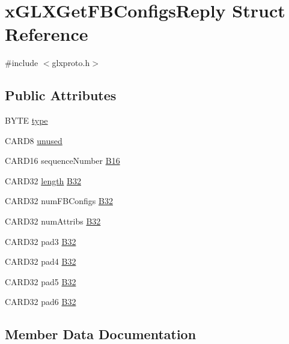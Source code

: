 \hypertarget{structx_g_l_x_get_f_b_configs_reply}{}\section{x\+G\+L\+X\+Get\+F\+B\+Configs\+Reply Struct Reference}
\label{structx_g_l_x_get_f_b_configs_reply}


{\ttfamily \#include $<$glxproto.\+h$>$}

\subsection*{Public Attributes}
\begin{DoxyCompactItemize}
\item 
B\+Y\+TE \hyperlink{structx_g_l_x_get_f_b_configs_reply_acb898b3d0a71dcc0e326ce35af8d2f04}{type}
\item 
C\+A\+R\+D8 \hyperlink{structx_g_l_x_get_f_b_configs_reply_ab613d10c2cf2423cbe3f851aae8828e7}{unused}
\item 
C\+A\+R\+D16 sequence\+Number \hyperlink{structx_g_l_x_get_f_b_configs_reply_abbff4e7ffe425b09e5b18979db3617a0}{B16}
\item 
C\+A\+R\+D32 \hyperlink{glcorearb_8h_ab9c919755bde3b34349e23a32b4e0fa7}{length} \hyperlink{structx_g_l_x_get_f_b_configs_reply_adfe70608434253084f11a15fa0c4e8b9}{B32}
\item 
C\+A\+R\+D32 num\+F\+B\+Configs \hyperlink{structx_g_l_x_get_f_b_configs_reply_a1e831c7ecfd35686f16e0305b35c3a22}{B32}
\item 
C\+A\+R\+D32 num\+Attribs \hyperlink{structx_g_l_x_get_f_b_configs_reply_a3cf0ca29a01964ffcd96e7df0cdeff78}{B32}
\item 
C\+A\+R\+D32 pad3 \hyperlink{structx_g_l_x_get_f_b_configs_reply_a51f54d8dc84c46328461aa779dbeda02}{B32}
\item 
C\+A\+R\+D32 pad4 \hyperlink{structx_g_l_x_get_f_b_configs_reply_ac2b1350d1dc729568d6c54d2c0e19601}{B32}
\item 
C\+A\+R\+D32 pad5 \hyperlink{structx_g_l_x_get_f_b_configs_reply_a920e112a5362bc9dd461a47aee6dff7b}{B32}
\item 
C\+A\+R\+D32 pad6 \hyperlink{structx_g_l_x_get_f_b_configs_reply_a8a7418b991ac5575652dec7be04aff68}{B32}
\end{DoxyCompactItemize}


\subsection{Member Data Documentation}
\mbox{\label{structx_g_l_x_get_f_b_configs_reply_abbff4e7ffe425b09e5b18979db3617a0}} 
